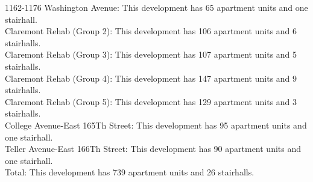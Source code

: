 {1162-1176 Washington Avenue}: This development has 65 apartment units and one stairhall.\\{Claremont Rehab (Group 2)}: This development has 106 apartment units and 6 stairhalls.\\{Claremont Rehab (Group 3)}: This development has 107 apartment units and 5 stairhalls.\\{Claremont Rehab (Group 4)}: This development has 147 apartment units and 9 stairhalls.\\{Claremont Rehab (Group 5)}: This development has 129 apartment units and 3 stairhalls.\\{College Avenue-East 165Th Street}: This development has 95 apartment units and one stairhall.\\{Teller Avenue-East 166Th Street}: This development has 90 apartment units and one stairhall.\\{Total}: This development has 739 apartment units and 26 stairhalls.\\